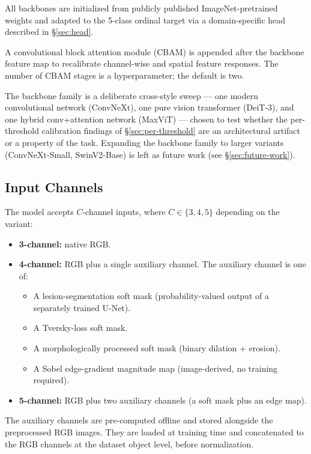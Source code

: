 \documentclass[11pt]{article}
\begin{document}
All backbones are initialized from publicly published ImageNet-pretrained weights and adapted to the 5-class ordinal target via a domain-specific head described in \S\ref{sec:head}.

A convolutional block attention module (CBAM) is appended after the backbone feature map to recalibrate channel-wise and spatial feature responses. The number of CBAM stages is a hyperparameter; the default is two.

The backbone family is a deliberate cross-style sweep --- one modern convolutional network (ConvNeXt), one pure vision transformer (DeiT-3), and one hybrid conv+attention network (MaxViT) --- chosen to test whether the per-threshold calibration findings of \S\ref{sec:per-threshold} are an architectural artifact or a property of the task. Expanding the backbone family to larger variants (ConvNeXt-Small, SwinV2-Base) is left as future work (see \S\ref{sec:future-work}).

\subsection{Input Channels}
\label{sec:input-channels}
The model accepts $C$-channel inputs, where $C \in \{3, 4, 5\}$ depending on the variant:
\begin{itemize}[leftmargin=*, topsep=0pt]
  \item \textbf{3-channel:} native RGB.
  \item \textbf{4-channel:} RGB plus a single auxiliary channel. The auxiliary channel is one of:
  \begin{itemize}
    \item A lesion-segmentation soft mask (probability-valued output of a separately trained U-Net).
    \item A Tversky-loss soft mask.
    \item A morphologically processed soft mask (binary dilation + erosion).
    \item A Sobel edge-gradient magnitude map (image-derived, no training required).
  \end{itemize}
  \item \textbf{5-channel:} RGB plus two auxiliary channels (a soft mask plus an edge map).
\end{itemize}

The auxiliary channels are pre-computed offline and stored alongside the preprocessed RGB images. They are loaded at training time and concatenated to the RGB channels at the dataset object level, before normalization.
\end{document}
